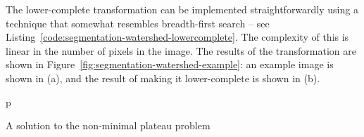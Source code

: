 The lower-complete transformation can be implemented straightforwardly using a technique that somewhat resembles breadth-first search -- see Listing~\ref{code:segmentation-watershed-lowercomplete}. The complexity of this is linear in the number of pixels in the image. The results of the transformation are shown in Figure~\ref{fig:segmentation-watershed-example}: an example image is shown in (a), and the result of making it lower-complete is shown in (b).

\begin{stusubfig}{p}
%
	\hspace{4mm}%
	\hspace{4mm}%
\caption{A solution to the non-minimal plateau problem}
\label{fig:segmentation-watershed-plateau}
\end{stusubfig}

